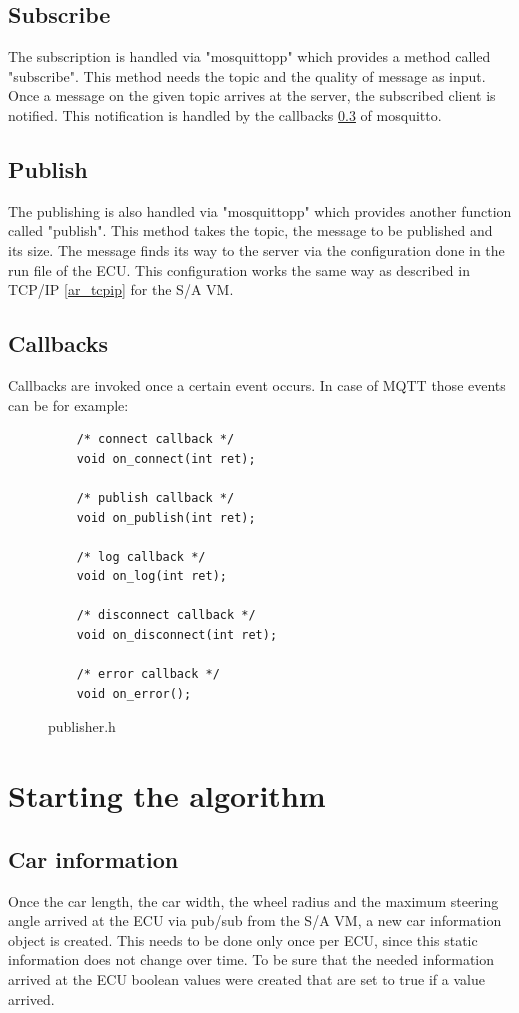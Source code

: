 \documentclass[paper=a4, fontsize=11pt]{scrreprt}
\begin{document}
  \subsection{Subscribe}
The subscription is handled via "mosquittopp" which provides a method called "subscribe". This method needs the topic and the quality of message as input. Once a message on the given topic arrives at the server, the subscribed client is notified. This notification is handled by the callbacks \ref{ar_callbacks} of mosquitto.
  \subsection{Publish}
The publishing is also handled via "mosquittopp" which provides another function called "publish". This method takes the topic, the message to be published and its size. The message finds its way to the server via the configuration done in the run file of the ECU. This configuration works the same way as described in TCP/IP \ref{ar_tcpip} for the S/A VM.
\newpage
  \subsection{Callbacks} \label{ar_callbacks}
Callbacks are invoked once a certain event occurs. In case of MQTT those events can be for example:\newline
\begin{figure}[!h]
  \centering
    \begin{verbatim}
	/* connect callback */
	void on_connect(int ret);

	/* publish callback */
	void on_publish(int ret);

	/* log callback */
	void on_log(int ret);

	/* disconnect callback */
	void on_disconnect(int ret);

	/* error callback */
	void on_error();
    \end{verbatim}
    \caption{publisher.h}
  \end{figure}
  \section{Starting the algorithm}
  \subsection{Car information}
Once the car length, the car width, the wheel radius and the maximum steering angle arrived at the ECU via pub/sub from the S/A VM, a new car information object is created. This needs to be done only once per ECU, since this static information does not change over time.
To be sure that the needed information arrived at the ECU boolean values were created that are set to true if a value arrived.
\end{document}
